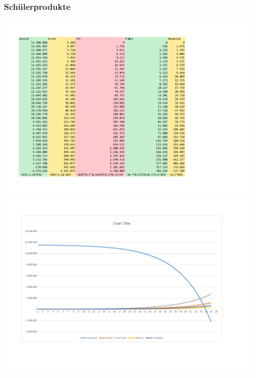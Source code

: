 \subsubsection{Schülerprodukte}
\includegraphics[width=\textwidth]{projekt/leistung_2_1}
\includegraphics[width=\textwidth]{projekt/leistung_2_2}
